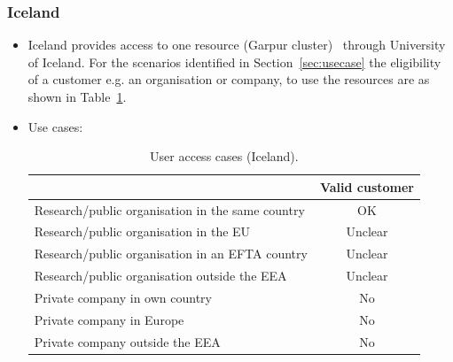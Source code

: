 \documentclass{article}
\begin{document}
\subsubsection{Iceland}
\begin{itemize}
    \item []
    Iceland provides access to one resource ({Garpur} cluster)~\cite{garpur} through University of Iceland. 
    For the scenarios identified in Section~\ref{sec:usecase} the eligibility of a customer e.g. an organisation or company, to use the resources are as shown in Table~\ref{tab:IS_use_cases}.
\item[] Use cases:
    \begin{table}[!h]
        \centering
        \begin{tabular}{|l|c|}
        \hline
             & Valid customer  \\
        \hline
 Research/public organisation in the same country & OK \\
        \hline
Research/public organisation in the EU & Unclear\\
        \hline
Research/public organisation in an EFTA country & Unclear\\
        \hline
Research/public organisation outside the EEA & Unclear\\
        \hline
Private company in own country & No\\
        \hline
Private company in Europe    & No\\
        \hline
Private company outside the EEA & No\\
        \hline 
        \end{tabular}
        \caption{User access cases (Iceland).}
        \label{tab:IS_use_cases}
    \end{table}
    

\end{itemize}
\end{document}
